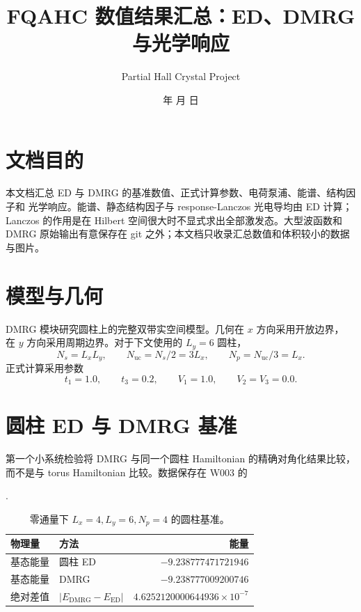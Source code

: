 \documentclass[11pt]{article}
\title{FQAHC 数值结果汇总：ED、DMRG 与光学响应}
\author{Partial Hall Crystal Project}
\date{\number\year 年 \number\month 月 \number\day 日}
\begin{document}
\maketitle

\section{文档目的}

本文档汇总 ED 与 DMRG 的基准数值、正式计算参数、电荷泵浦、能谱、结构因子和
光学响应。能谱、静态结构因子与 response-Lanczos 光电导均由 ED 计算；
Lanczos 的作用是在 Hilbert 空间很大时不显式求出全部激发态。大型波函数和 DMRG
原始输出有意保存在 git 之外；本文档只收录汇总数值和体积较小的数据与图片。

\section{模型与几何}

DMRG 模块研究圆柱上的完整双带实空间模型。几何在 \(x\) 方向采用开放边界，
在 \(y\) 方向采用周期边界。对于下文使用的 \(L_y=6\) 圆柱，
\[
  N_s = L_x L_y, \qquad N_{\mathrm{uc}} = N_s/2 = 3L_x,
  \qquad N_p = N_{\mathrm{uc}}/3 = L_x .
\]
正式计算采用参数
\[
  t_1=1.0,\qquad t_3=0.2,\qquad V_1=1.0,\qquad V_2=V_3=0.0 .
\]

\section{圆柱 ED 与 DMRG 基准}

第一个小系统检验将 DMRG 与同一个圆柱 Hamiltonian 的精确对角化结果比较，
而不是与 torus Hamiltonian 比较。数据保存在 W003 的
\begin{center}
\small{}.
\end{center}

\begin{table}[h]
\centering
\caption{零通量下 \(L_x=4,L_y=6,N_p=4\) 的圆柱基准。}
\begin{tabular}{llr}
\toprule
物理量 & 方法 & 能量 \\
\midrule
基态能量 & 圆柱 ED & \(-9.238777471721946\) \\
基态能量 & DMRG & \(-9.238777009200746\) \\
绝对差值 & \(|E_{\mathrm{DMRG}}-E_{\mathrm{ED}}|\) & \(4.6252120000644936\times 10^{-7}\) \\
\bottomrule
\end{tabular}
\end{table}
\end{document}
